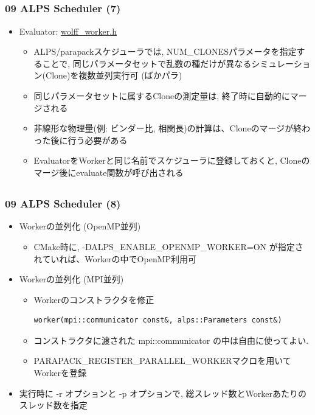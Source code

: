 \subsection*{\redm\whitem\greenb}
\begin{frame}[fragile]
  \frametitle{09 ALPS Scheduler (7)}
  \begin{itemize}
    \item Evaluator: \href{https://github.com/cmsi/alps-tutorial/blob/develop/alpsize/09-wolff_worker.h}{wolff\_worker.h}
      \begin{itemize}
      \item ALPS/parapackスケジューラでは, NUM\_CLONESパラメータを指定することで, 同じパラメータセットで乱数の種だけが異なるシミュレーション(Clone)を複数並列実行可 (ばかパラ)
      \item 同じパラメータセットに属するCloneの測定量は, 終了時に自動的にマージされる
      \item 非線形な物理量(例: ビンダー比, 相関長)の計算は、Cloneのマージが終わった後に行う必要がある
      \item EvaluatorをWorkerと同じ名前でスケジューラに登録しておくと, Cloneのマージ後にevaluate関数が呼び出される
      \end{itemize}
  \end{itemize}
\end{frame}

\subsection*{\redm\whitem\greenb}
\begin{frame}[fragile]
  \frametitle{09 ALPS Scheduler (8)}
  \begin{itemize}
    \item Workerの並列化 (OpenMP並列)
      \begin{itemize}
      \item CMake時に, -DALPS\_ENABLE\_OPENMP\_WORKER=ON が指定されていれば、Workerの中でOpenMP利用可
      \end{itemize}
    \item Workerの並列化 (MPI並列)
      \begin{itemize}
      \item Workerのコンストラクタを修正
\begin{lstlisting}
worker(mpi::communicator const&, alps::Parameters const&)
\end{lstlisting}
      \item コンストラクタに渡された mpi::communicator の中は自由に使ってよい.
      \item {\color{red} PARAPACK\_REGISTER\_PARALLEL\_WORKER}マクロを用いてWorkerを登録
      \end{itemize}
    \item 実行時に -r オプションと -p オプションで, 総スレッド数とWorkerあたりのスレッド数を指定
  \end{itemize}
\end{frame}

